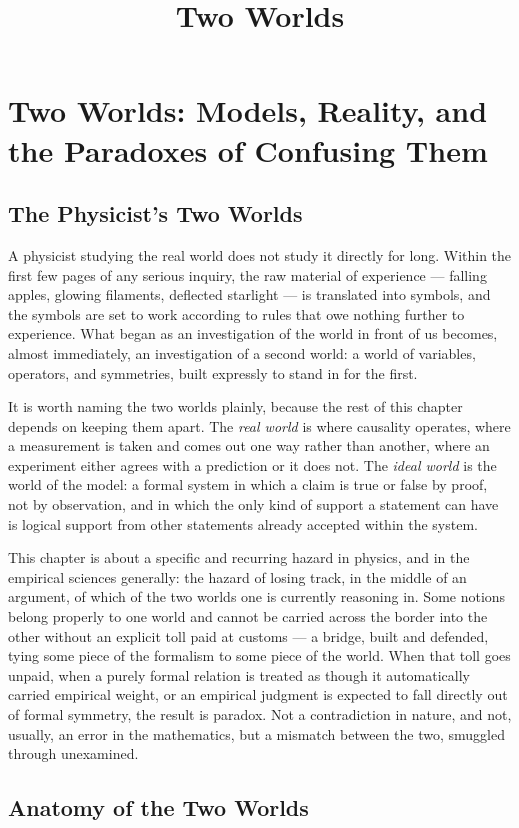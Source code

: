 \documentclass[11pt]{book}
\title{Two Worlds}
\author{}
\date{}
\begin{document}
\chapter{Two Worlds: Models, Reality, and the Paradoxes of Confusing Them}
\label{chap:two-worlds}

\section{The Physicist's Two Worlds}

A physicist studying the real world does not study it directly for long. Within the first few pages of any serious inquiry, the raw material of experience --- falling apples, glowing filaments, deflected starlight --- is translated into symbols, and the symbols are set to work according to rules that owe nothing further to experience. What began as an investigation of the world in front of us becomes, almost immediately, an investigation of a second world: a world of variables, operators, and symmetries, built expressly to stand in for the first.

It is worth naming the two worlds plainly, because the rest of this chapter depends on keeping them apart. The \emph{real world} is where causality operates, where a measurement is taken and comes out one way rather than another, where an experiment either agrees with a prediction or it does not. The \emph{ideal world} is the world of the model: a formal system in which a claim is true or false by proof, not by observation, and in which the only kind of support a statement can have is logical support from other statements already accepted within the system.

This chapter is about a specific and recurring hazard in physics, and in the empirical sciences generally: the hazard of losing track, in the middle of an argument, of which of the two worlds one is currently reasoning in. Some notions belong properly to one world and cannot be carried across the border into the other without an explicit toll paid at customs --- a bridge, built and defended, tying some piece of the formalism to some piece of the world. When that toll goes unpaid, when a purely formal relation is treated as though it automatically carried empirical weight, or an empirical judgment is expected to fall directly out of formal symmetry, the result is paradox. Not a contradiction in nature, and not, usually, an error in the mathematics, but a mismatch between the two, smuggled through unexamined.

\section{Anatomy of the Two Worlds}
\end{document}
